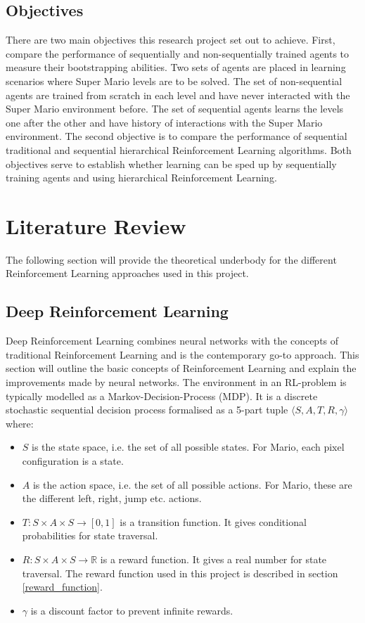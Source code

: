 \documentclass[notitlepage,a4paper,11pt]{article}
\newcommand{\R}{\mathbb{R}}
\begin{document}
\subsection{Objectives}
There are two main objectives this research project set out to achieve. First, compare the performance of sequentially and non-sequentially trained agents to measure their bootstrapping abilities. Two sets of agents are placed in learning scenarios where Super Mario levels are to be solved. The set of non-sequential agents are trained from scratch in each level and have never interacted with the Super Mario environment before. The set of sequential agents learns the levels one after the other and have history of interactions with the Super Mario environment. The second objective is to compare the performance of sequential traditional and sequential hierarchical Reinforcement Learning algorithms. Both objectives serve to establish whether learning can be sped up by sequentially training agents and using hierarchical Reinforcement Learning.

\section{Literature Review}
The following section will provide the theoretical underbody for the different Reinforcement Learning approaches used in this project. 


\subsection{Deep Reinforcement Learning}\label{deep_rl}
Deep Reinforcement Learning combines neural networks with the concepts of traditional Reinforcement Learning and is the contemporary go-to approach. This section will outline the basic concepts of Reinforcement Learning and explain the improvements made by neural networks. The environment in an RL-problem is typically modelled as a Markov-Decision-Process (MDP). It is a discrete stochastic sequential decision process \cite{puterman2014markov} formalised as a 5-part tuple $\langle S, A, T, R, \gamma \rangle$ where:

\begin{itemize}[noitemsep]
	\item $S$ is the state space, i.e. the set of all possible states. For Mario, each pixel configuration is a state.
	\item $A$ is the action space, i.e. the set of all possible actions. For Mario, these are the different left, right, jump etc. actions.
	\item $T : S \times A \times S \to [0,1]$ is a transition function. It gives conditional probabilities for state traversal.
	\item $R : S \times A \times S \to \R$ is a reward function. It gives a real number for state traversal. The reward function used in this project is described in section \ref{reward_function}.
	\item $\gamma$ is a discount factor to prevent infinite rewards.
\end{itemize}
\end{document}
